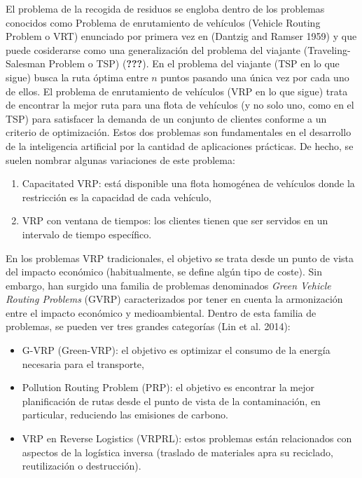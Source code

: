\documentclass[
]{article}
\providecommand{\tightlist}{%
  \setlength{\itemsep}{0pt}\setlength{\parskip}{0pt}}
\begin{document}
El problema de la recogida de residuos se engloba dentro de los
problemas conocidos como Problema de enrutamiento de vehículos (Vehicle
Routing Problem o VRT) enunciado por primera vez en (Dantzig and Ramser
1959) y que puede cosiderarse como una generalización del problema del
viajante (Traveling-Salesman Problem o TSP) ({\textbf{???}}). En el
problema del viajante (TSP en lo que sigue) busca la ruta óptima entre
\(n\) puntos pasando una única vez por cada uno de ellos. El problema de
enrutamiento de vehículos (VRP en lo que sigue) trata de encontrar la
mejor ruta para una flota de vehículos (y no solo uno, como en el TSP)
para satisfacer la demanda de un conjunto de clientes conforme a un
criterio de optimización. Estos dos problemas son fundamentales en el
desarrollo de la inteligencia artificial por la cantidad de aplicaciones
prácticas. De hecho, se suelen nombrar algunas variaciones de este
problema:

\begin{enumerate}
\def\labelenumi{(\roman{enumi})}
\tightlist
\item
  Capacitated VRP: está disponible una flota homogénea de vehículos
  donde la restricción es la capacidad de cada vehículo,
\item
  VRP con ventana de tiempos: los clientes tienen que ser servidos en un
  intervalo de tiempo específico.
\end{enumerate}

En los problemas VRP tradicionales, el objetivo se trata desde un punto
de vista del impacto económico (habitualmente, se define algún tipo de
coste). Sin embargo, han surgido una familia de problemas denominados
\emph{Green Vehicle Routing Problems} (GVRP) caracterizados por tener en
cuenta la armonización entre el impacto económico y medioambiental.
Dentro de esta familia de problemas, se pueden ver tres grandes
categorías (Lin et al. 2014):

\begin{itemize}
\tightlist
\item
  G-VRP (Green-VRP): el objetivo es optimizar el consumo de la energía
  necesaria para el transporte,
\item
  Pollution Routing Problem (PRP): el objetivo es encontrar la mejor
  planificación de rutas desde el punto de vista de la contaminación, en
  particular, reduciendo las emisiones de carbono.
\item
  VRP en Reverse Logistics (VRPRL): estos problemas están relacionados
  con aspectos de la logística inversa (traslado de materiales apra su
  reciclado, reutilización o destrucción).
\end{itemize}
\end{document}
